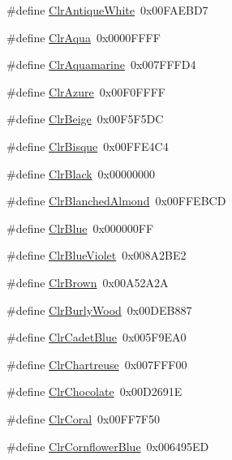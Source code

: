 \begin{DoxyCompactItemize}
\#define \hyperlink{group__primitives__api_ga581775bdf6f916b683f8463b576a4b41}{Clr\+Antique\+White}~0x00\+F\+A\+E\+B\+D7
\item 
\#define \hyperlink{group__primitives__api_ga87cfae4a204e84e4aa7cd4d93a044892}{Clr\+Aqua}~0x0000\+F\+F\+F\+F
\item 
\#define \hyperlink{group__primitives__api_ga11744daacf236bbcd2e964587746f808}{Clr\+Aquamarine}~0x007\+F\+F\+F\+D4
\item 
\#define \hyperlink{group__primitives__api_gae2426904f281372116820c15c6c93232}{Clr\+Azure}~0x00\+F0\+F\+F\+F\+F
\item 
\#define \hyperlink{group__primitives__api_gaf9beafebe07cdd556c090bad82783b18}{Clr\+Beige}~0x00\+F5\+F5\+D\+C
\item 
\#define \hyperlink{group__primitives__api_ga0eaf6039bf2da207ea242709495e4700}{Clr\+Bisque}~0x00\+F\+F\+E4\+C4
\item 
\#define \hyperlink{group__primitives__api_gae68bd8966702128d6463b92d24b5b66b}{Clr\+Black}~0x00000000
\item 
\#define \hyperlink{group__primitives__api_ga25e1b8dc7e59506b1a1b5e52bf839167}{Clr\+Blanched\+Almond}~0x00\+F\+F\+E\+B\+C\+D
\item 
\#define \hyperlink{group__primitives__api_ga3eea8955621090cfcea422248ac96017}{Clr\+Blue}~0x000000\+F\+F
\item 
\#define \hyperlink{group__primitives__api_ga101a21ed98e3ad3d1eb8678ff95b5313}{Clr\+Blue\+Violet}~0x008\+A2\+B\+E2
\item 
\#define \hyperlink{group__primitives__api_ga15b2e355a7959b5d5acc73665f3fcd08}{Clr\+Brown}~0x00\+A52\+A2\+A
\item 
\#define \hyperlink{group__primitives__api_gaa3c8f9d0ecf34337983dabb0015fdb3e}{Clr\+Burly\+Wood}~0x00\+D\+E\+B887
\item 
\#define \hyperlink{group__primitives__api_ga7dd514a42eb27b916a9597508c4f1f8d}{Clr\+Cadet\+Blue}~0x005\+F9\+E\+A0
\item 
\#define \hyperlink{group__primitives__api_ga80f014f08e40b8d258b3294e9461e45a}{Clr\+Chartreuse}~0x007\+F\+F\+F00
\item 
\#define \hyperlink{group__primitives__api_ga422164b1351b847858ef55d3b7be69ea}{Clr\+Chocolate}~0x00\+D2691\+E
\item 
\#define \hyperlink{group__primitives__api_ga14831d170f775fa6a200d9bf02b10190}{Clr\+Coral}~0x00\+F\+F7\+F50
\item 
\#define \hyperlink{group__primitives__api_ga2154284c30a3f0803fbf3499f0078a4f}{Clr\+Cornflower\+Blue}~0x006495\+E\+D

\end{DoxyCompactItemize}
